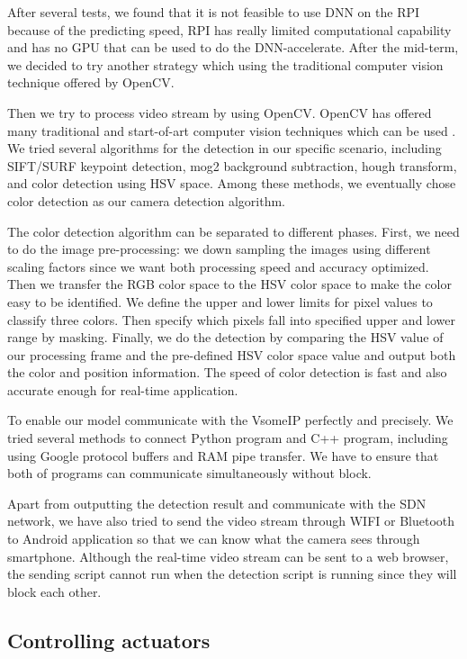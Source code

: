 \documentclass[11pt, titlepage]{article} %
\begin{document}
After several tests, we found that it is not feasible to use DNN on the RPI because of the predicting speed, RPI has really limited computational capability and has no GPU that can be used to do the DNN-accelerate. After the mid-term, we decided to try another strategy which using the traditional computer vision technique offered by OpenCV.

Then we try to process video stream by using OpenCV. OpenCV has offered many traditional and start-of-art computer vision techniques which can be used . We tried several algorithms for the detection in our specific scenario, including SIFT/SURF keypoint detection, mog2 background subtraction, hough transform, and color detection using HSV space. Among these methods, we eventually chose color detection as our camera detection algorithm.

The color detection algorithm can be separated to different phases. First, we need to do the image pre-processing: we down sampling the images using different scaling factors since we want both processing speed and accuracy optimized. Then we transfer the RGB color space to the HSV color space to make the color easy to be identified. We define the upper and lower limits for pixel values to classify three colors. Then specify which pixels fall into specified upper and lower range by masking. Finally, we do the detection by comparing the HSV value of our processing frame and the pre-defined HSV color space value and output both the color and position information. The speed of color detection is fast and also accurate enough for real-time application.

To enable our model communicate with the VsomeIP perfectly and precisely. We tried several methods to connect Python program and C++ program, including using Google protocol buffers and RAM pipe transfer. We have to ensure that both of programs can communicate simultaneously without block. 

Apart from outputting the detection result and communicate with the SDN network, we have also tried to send the video stream through WIFI or Bluetooth to Android application so that we can know what the camera sees through smartphone. Although the real-time video stream can be sent to a web browser, the sending script cannot run when the detection script is running since they will block each other.


\subsection{Controlling actuators}
\end{document}
